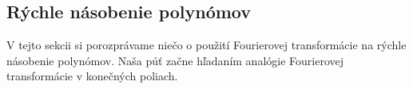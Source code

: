 \subsection{Rýchle násobenie polynómov}

V tejto sekcii si porozprávame niečo o použití Fourierovej
transformácie na rýchle násobenie polynómov. Naša púť začne hľadaním
analógie Fourierovej transformácie v konečných poliach.

%
%
%

